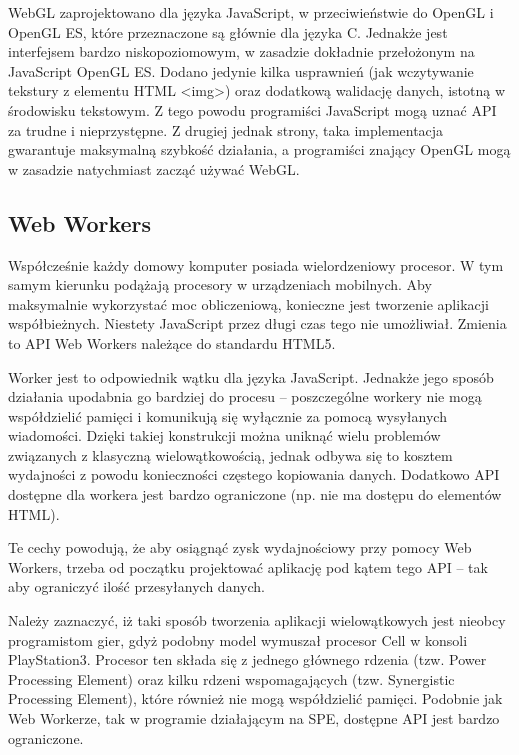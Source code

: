 WebGL zaprojektowano dla języka JavaScript, w przeciwieństwie do OpenGL i OpenGL ES,
które przeznaczone są głównie dla języka C. Jednakże jest interfejsem bardzo
niskopoziomowym, w zasadzie dokładnie przełożonym na JavaScript OpenGL ES. Dodano
jedynie kilka usprawnień (jak wczytywanie tekstury z elementu HTML <img>) oraz
dodatkową walidację danych, istotną w środowisku tekstowym. Z tego powodu programiści
JavaScript mogą uznać API za trudne i nieprzystępne. Z drugiej jednak strony, taka
implementacja gwarantuje maksymalną szybkość działania, a programiści znający OpenGL mogą
w zasadzie natychmiast zacząć używać WebGL.


\subsection{Web Workers}
\label{ssec:webWorkers}

Współcześnie każdy domowy komputer posiada wielordzeniowy procesor. W tym samym kierunku
podążają procesory w urządzeniach mobilnych. Aby maksymalnie wykorzystać moc obliczeniową,
konieczne jest tworzenie aplikacji współbieżnych. Niestety JavaScript przez długi czas
tego nie umożliwiał. Zmienia to API Web Workers należące do standardu HTML5.

Worker jest to odpowiednik wątku dla języka JavaScript. Jednakże jego sposób działania
upodabnia go bardziej do procesu -- poszczególne workery nie mogą współdzielić pamięci
i komunikują się wyłącznie za pomocą wysyłanych wiadomości. Dzięki takiej konstrukcji
można uniknąć wielu problemów związanych z klasyczną wielowątkowością, jednak odbywa
się to kosztem wydajności z powodu konieczności częstego kopiowania danych. Dodatkowo
API dostępne dla workera jest bardzo ograniczone (np. nie ma dostępu do elementów HTML).

Te cechy powodują, że aby osiągnąć zysk wydajnościowy przy pomocy Web Workers, trzeba od
początku projektować aplikację pod kątem tego API -- tak aby ograniczyć ilość przesyłanych
danych.

Należy zaznaczyć, iż taki sposób tworzenia aplikacji wielowątkowych jest nieobcy programistom
gier, gdyż podobny model wymuszał procesor Cell w konsoli PlayStation3. Procesor ten składa
się z jednego głównego rdzenia (tzw. Power Processing Element) oraz kilku rdzeni wspomagających
(tzw. Synergistic Processing Element), które również nie mogą współdzielić pamięci. Podobnie jak
Web Workerze, tak w programie działającym na SPE, dostępne API jest bardzo ograniczone.

